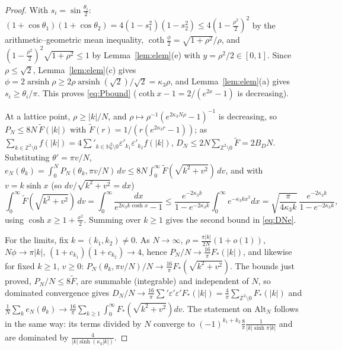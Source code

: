 \documentclass[11pt,a4paper]{article}
\newcommand{\Z}{\mathbb Z}
\theoremstyle{plain}
\theoremstyle{definition}
\numberwithin{equation}{section}
\begin{document}
\begin{proof}
With $s_i=\sin\frac{\theta_i}2$: $(1+\cos\theta_1)(1+\cos\theta_2)=4(1-s_1^2)(1-s_2^2)\le4(1-\frac{\rho^2}2)^2$ by the arithmetic--geometric mean inequality, $\coth\frac\phi2=\sqrt{1+\rho^2}/\rho$, and $(1-\frac{\rho^2}{2})^2\sqrt{1+\rho^2}\le1$ by Lemma~\ref{lem:elem}(e) with $y=\rho^2/2\in[0,1]$. Since $\rho\le\sqrt2$, Lemma~\ref{lem:elem}(c) gives $\phi=2\operatorname{arsinh}\rho\ge2\rho\operatorname{arsinh}(\sqrt2)/\sqrt2=\kappa_3\rho$, and Lemma~\ref{lem:elem}(a) gives $s_i\ge\theta_i/\pi$. This proves \eqref{eq:Pbound} ($\coth x-1=2/(e^{2x}-1)$ is decreasing).

At a lattice point, $\rho\ge|k|/N$, and $\rho\mapsto\rho^{-1}(e^{2\kappa_3N\rho}-1)^{-1}$ is decreasing, so $P_N\le8N\,\tilde F(|k|)$ with $\tilde F(r)=1/(r(e^{2\kappa_3r}-1))$; as $\sum_{k\in\Z^2\setminus0}f(|k|)=4\sum'_{k\in\mathbb N_0^2\setminus0}\varepsilon'_{k_1}\varepsilon'_{k_2}f(|k|)$, $D_N\le2N\sum_{\Z^2\setminus0}\tilde F=2B_DN$.
Substituting $\theta'=\pi v/N$, $e_N(\theta_k)=\int_0^NP_N(\theta_k,\pi v/N)\,dv\le8N\int_0^\infty\tilde F(\sqrt{k^2+v^2})\,dv$, and with $v=k\sinh x$ (so $dv/\sqrt{k^2+v^2}=dx$)
\[
\int_0^\infty\tilde F(\sqrt{k^2+v^2})\,dv=\int_0^\infty\frac{dx}{e^{2\kappa_3k\cosh x}-1}\le\frac{e^{-2\kappa_3k}}{1-e^{-2\kappa_3k}}\int_0^\infty e^{-\kappa_3kx^2}dx=\sqrt{\frac{\pi}{4\kappa_3k}}\,\frac{e^{-2\kappa_3k}}{1-e^{-2\kappa_3k}},
\]
using $\cosh x\ge1+\frac{x^2}2$. Summing over $k\ge1$ gives the second bound in \eqref{eq:DNe}.

For the limits, fix $k=(k_1,k_2)\ne0$. As $N\to\infty$, $\rho=\frac{\pi|k|}{2N}(1+o(1))$, $N\phi\to\pi|k|$, $(1+c_{k_1})(1+c_{k_2})\to4$, hence $P_N/N\to\frac{16}{\pi}F_*(|k|)$, and likewise for fixed $k\ge1$, $v\ge0$: $P_N(\theta_k,\pi v/N)/N\to\frac{16}\pi F_*(\sqrt{k^2+v^2})$. The bounds just proved, $P_N/N\le8\tilde F$, are summable (integrable) and independent of $N$, so dominated convergence gives
$D_N/N\to\frac{16}\pi\sum'\varepsilon'\varepsilon'F_*(|k|)=\frac4\pi\sum_{\Z^2\setminus0}F_*(|k|)$ and $\frac1N\sum_ke_N(\theta_k)\to\frac{16}\pi\sum_{k\ge1}\int_0^\infty F_*(\sqrt{k^2+v^2})dv$. The statement on $\mathrm{Alt}_N$ follows in the same way: its terms divided by $N$ converge to $(-1)^{k_1+k_2}\frac{8}{\pi}\frac{1}{|k|\sinh\pi|k|}$ and are dominated by $\frac{4}{|k|\sinh(\kappa_3|k|)}$.
\end{proof}
\end{document}
